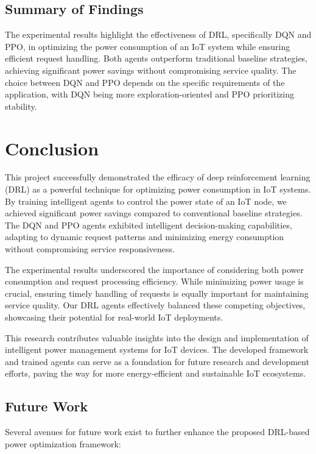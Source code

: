 \documentclass[11pt,a4paper]{article}
\begin{document}
\subsection{Summary of Findings}

The experimental results highlight the effectiveness of DRL, specifically DQN and PPO, in optimizing the power consumption of an IoT system while ensuring efficient request handling. Both agents outperform traditional baseline strategies, achieving significant power savings without compromising service quality. The choice between DQN and PPO depends on the specific requirements of the application, with DQN being more exploration-oriented and PPO prioritizing stability.


\section{Conclusion}

This project successfully demonstrated the efficacy of deep reinforcement learning (DRL) as a powerful technique for optimizing power consumption in IoT systems. By training intelligent agents to control the power state of an IoT node, we achieved significant power savings compared to conventional baseline strategies. The DQN and PPO agents exhibited intelligent decision-making capabilities, adapting to dynamic request patterns and minimizing energy consumption without compromising service responsiveness.

The experimental results underscored the importance of considering both power consumption and request processing efficiency. While minimizing power usage is crucial, ensuring timely handling of requests is equally important for maintaining service quality. Our DRL agents effectively balanced these competing objectives, showcasing their potential for real-world IoT deployments.

This research contributes valuable insights into the design and implementation of intelligent power management systems for IoT devices. The developed framework and trained agents can serve as a foundation for future research and development efforts, paving the way for more energy-efficient and sustainable IoT ecosystems.

\subsection{Future Work}

Several avenues for future work exist to further enhance the proposed DRL-based power optimization framework:
\end{document}
